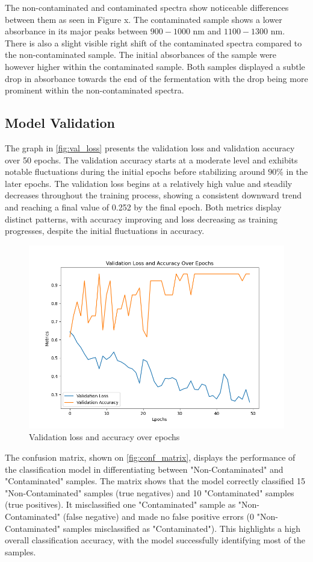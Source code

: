 \documentclass[12pt]{report}
\begin{document}
The non-contaminated and contaminated spectra show noticeable differences between them as seen in Figure x. The contaminated sample shows a lower absorbance in its major peaks between $900-1000$ nm and $1100-1300$ nm. There is also a slight visible right shift of the contaminated spectra compared to the non-contaminated sample. The initial absorbances of the sample were however higher within the contaminated sample. Both samples displayed a subtle drop in absorbance towards the end of the fermentation with the drop being more prominent within the non-contaminated spectra.

\subsection{Model Validation}

The graph in \autoref{fig:val_loss} presents the validation loss and validation accuracy over 50 epochs. The validation accuracy starts at a moderate level and exhibits notable fluctuations during the initial epochs before stabilizing around $90\%$ in the later epochs. The validation loss begins at a relatively high value and steadily decreases throughout the training process, showing a consistent downward trend and reaching a final value of 0.252 by the final epoch. Both metrics display distinct patterns, with accuracy improving and loss decreasing as training progresses, despite the initial fluctuations in accuracy.

\begin{figure}[!h]
    \centering
    \includegraphics[width=0.75\linewidth]{Images/aa.png}
    \caption{Validation loss and accuracy over epochs}
    \label{fig:val_loss}
\end{figure}

The confusion matrix, shown on \autoref{fig:conf_matrix}, displays the performance of the classification model in differentiating between "Non-Contaminated" and "Contaminated" samples. The matrix shows that the model correctly classified 15 "Non-Contaminated" samples (true negatives) and 10 "Contaminated" samples (true positives). It misclassified one "Contaminated" sample as "Non-Contaminated" (false negative) and made no false positive errors (0 "Non-Contaminated" samples misclassified as "Contaminated"). This highlights a high overall classification accuracy, with the model successfully identifying most of the samples.
\end{document}
